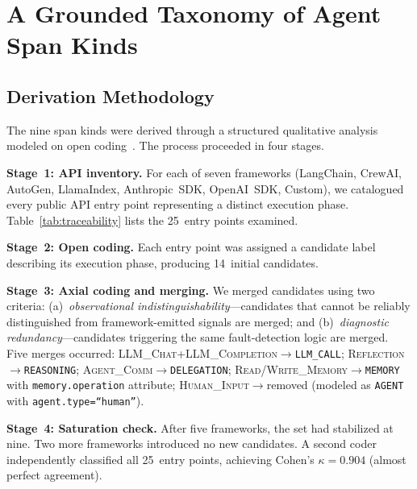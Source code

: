 \documentclass{article}
\begin{document}
\section{A Grounded Taxonomy of Agent Span Kinds}
\label{sec:taxonomy}

\subsection{Derivation Methodology}

The nine span kinds were derived through a structured qualitative
analysis modeled on open coding~\citep{strauss_corbin}.  The process
proceeded in four stages.

\textbf{Stage~1: API inventory.}  For each of seven frameworks
(LangChain, CrewAI, AutoGen, LlamaIndex, Anthropic~SDK, OpenAI~SDK,
Custom), we catalogued every public API entry point representing a
distinct execution phase.  Table~\ref{tab:traceability} lists the
25~entry points examined.

\textbf{Stage~2: Open coding.}  Each entry point was assigned a
candidate label describing its execution phase, producing 14~initial
candidates.

\textbf{Stage~3: Axial coding and merging.}  We merged candidates
using two criteria: (a)~\emph{observational
indistinguishability}---candidates that cannot be reliably
distinguished from framework-emitted signals are merged; and
(b)~\emph{diagnostic redundancy}---candidates triggering the same
fault-detection logic are merged.  Five merges occurred:
\textsc{LLM\_Chat}+\textsc{LLM\_Completion}$\to$\texttt{LLM\_CALL};
\textsc{Reflection}$\to$\texttt{REASONING};
\textsc{Agent\_Comm}$\to$\texttt{DELEGATION};
\textsc{Read/Write\_Memory}$\to$\texttt{MEMORY} with
\texttt{memory.operation} attribute;
\textsc{Human\_Input}$\to$removed (modeled as
\texttt{AGENT} with \texttt{agent.type=``human''}).

\textbf{Stage~4: Saturation check.}  After five frameworks, the set
had stabilized at nine.  Two more frameworks introduced no new
candidates.  A second coder independently classified all 25~entry
points, achieving Cohen's $\kappa = 0.904$ (almost perfect agreement).
\end{document}
